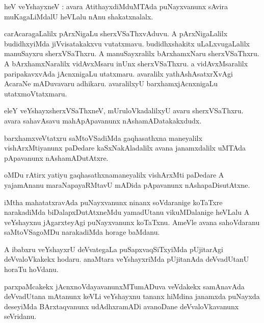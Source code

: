 \documentclass{article}
\begin{document}
\begin{mn}
heV veYshayxneV : avara AtithayxdiMduMTAda puNayxvanunx sAvira muKagaLiMdalU heVLalu nAnu 
shakatxnalalx. 
\end{mn}

\begin{mn}
carAcaragaLalilx pArxNigaLu sherxVSaThxvAduvu. A pArxNigaLalilx budidhxyiMda jiVvisatakakxvu
vutatxmavu. budidhxshakitx uLaLxvugaLalilx manuSayxru sherxVSaThxru. A manuSayxralilx bArxhamxNaru
sherxVSaThxru. A bArxhamxNaralilx vidAvxMsaru inUnx sherxVSaThxru. a vidAvxMsaralilx 
paripakavxvAda jAcnxnigaLu utatxmaru. avaralilx yathAshAsatxrXvAgi AcaraNe mADuvavaru adhikaru. 
avaralilxyU  barxhamxjAcnxnigaLu utatxmoVtatxmaru.
\end{mn}

\begin{mn}
eleY veYshayxsherxVSaThxneV, mUruloVkadalilxyU avaru sherxVSaThxru. avara sahavAsavu mahApApavanunx 
nAshamADatakakxdudx.
\end{mn}

\begin{mn}
barxhamxveVtatxru saMtoVSadiMda gaqhasathxna maneyalilx vishArxMtiyanunx paDedare kaSxNakAladalilx 
avana janamxdalilx uMTAda pApavanunx nAshamADutAtxre.
\end{mn}

\begin{mn}
oMDu rAtirx yatiyu gaqhasathxnamaneyalilx vishArxMti paDedare A  yajamAnanu maraNapayaRMtavU mADida 
pApavanunx nAshapaDisutAtxne.
\end{mn}

\begin{mn}
iMtha mahatatxravAda puNayxvanunx ninanx soVdaranige koTaTxre narakadiMda biDalapxDutAtxneMdu 
yamadUtanu vikuMDalanige heVLalu A veYshayxnu jAgarxteyAgi puNayxvanunx koTaTxnu.  AmeVle avana 
sahoVdaranu saMtoVSagoMDu narakadiMda horage baMdanu.
\end{mn}

\begin{mn}
A ibabxru veYshayxrU deVvategaLa puSapxvaqSiTxyiMda pUjitarAgi deVvaloVkakekx hodaru. anaMtara 
veYshayxriMda pUjitanAda deVvadUtanU horaTu hoVdanu.
\end{mn}

\begin{mn}
parxpaMcakekx jAcnxnoVdayavanunxMTumADuva veVdakekx samAnavAda deVvadUtana mAtanunx keVLi 
veYshayxnu tananx hiMdina janamxda puNayxda deseyiMda BArxtaqvanunx udAdhxramADi avanoDane 
deVvaloVkavanunx seVridanu. 
\end{mn}
\end{document}
